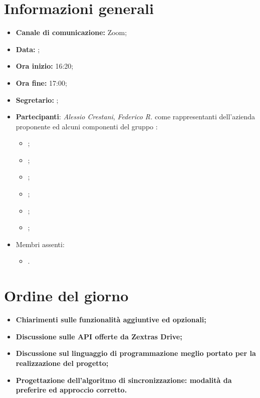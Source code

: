 \section{Informazioni generali}

\begin{itemize}

	\item \textbf{Canale di comunicazione:} Zoom;
	
	\item \textbf{Data:} \DataMeeting{};
	
	\item \textbf{Ora inizio:} 16:20;
	
	\item \textbf{Ora fine:} 17:00;
	
	\item \textbf{Segretario:} \Lucrezia{};
	
	\item \textbf{Partecipanti}: \textit{Alessio Crestani}, \textit{Federico R.} come rappresentanti dell'azienda proponente \proponente{} ed alcuni componenti del gruppo \Gruppo{}:
	
		\begin{itemize}
			\item \Daniele{};
			\item \Davide{};
			\item \Francesco{};
			\item \Giosue{};
			\item \Lucrezia{};
			\item \Matteo{};
		\end{itemize}



	\item Membri assenti:
		\begin{itemize}
			\item \Tommaso{}.
		\end{itemize}
	\end{itemize}
\section{Ordine del giorno}

\begin{itemize}
	\item\textbf{Chiarimenti sulle funzionalità aggiuntive ed opzionali;}
	\item\textbf{Discussione sulle API offerte da Zextras Drive;}
	\item\textbf{Discussione sul linguaggio di programmazione meglio portato per la realizzazione del progetto;}
	\item\textbf{Progettazione dell'algoritmo di sincronizzazione: modalità da preferire ed approccio corretto.}


\end{itemize}

